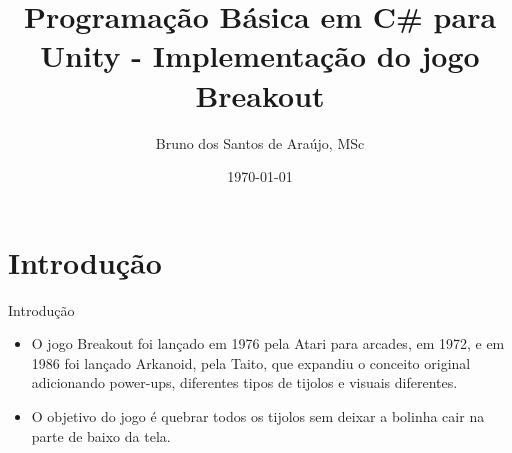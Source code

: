 \documentclass{beamer}
\begin{document}
\title{Programação Básica em C\# para Unity - Implementação do jogo Breakout}   
\author{Bruno dos Santos de Araújo, MSc} 
\date{\today} 

\frame{\titlepage} 

\section{Introdução}

\begin{frame}[fragile]{Introdução}

\begin{itemize}
	\item O jogo Breakout foi lançado em 1976 pela Atari para arcades, em 1972, e em 1986 foi lançado Arkanoid, pela Taito, que expandiu o conceito original adicionando power-ups, diferentes tipos de tijolos e visuais diferentes.
	\item O objetivo do jogo é quebrar todos os tijolos sem deixar a bolinha cair na parte de baixo da tela.

\end{itemize}


\end{frame}
\end{document}
